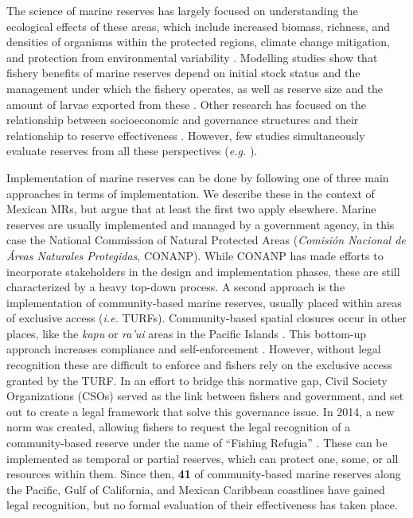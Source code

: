 \documentclass{frontiersSCNS}
\begin{document}
The science of marine reserves has largely focused on understanding the
ecological effects of these areas, which include increased biomass,
richness, and densities of organisms within the protected regions,
climate change mitigation, and protection from environmental variability
\citep{lester_2009-Ks,giakoumi_2017-V2,sala_2017-69,roberts_2017-J9,micheli_2012-EU}.
Modelling studies show that fishery benefits of marine reserves depend
on initial stock status and the management under which the fishery
operates, as well as reserve size and the amount of larvae exported from
these \citep{hilborn_2006,krueck_2017-J1}. Other research has focused on
the relationship between socioeconomic and governance structures and
their relationship to reserve effectiveness
\citep{halpern_2013,lpezangarita_2014,mascia_2017-m_}. However, few
studies simultaneously evaluate reserves from all these perspectives
(\emph{e.g.} \citet{lpezangarita_2014}).

Implementation of marine reserves can be done by following one of three
main approaches in terms of implementation. We describe these in the
context of Mexican MRs, but argue that at least the first two apply
elsewhere. Marine reserves are usually implemented and managed by a
government agency, in this case the National Commission of Natural
Protected Areas (\emph{Comisión Nacional de Áreas Naturales Protegidas},
CONANP). While CONANP has made efforts to incorporate stakeholders in
the design and implementation phases, these are still characterized by a
heavy top-down process. A second approach is the implementation of
community-based marine reserves, usually placed within areas of
exclusive access (\emph{i.e.} TURFs). Community-based spatial closures
occur in other places, like the \emph{kapu} or \emph{ra'ui} areas in the
Pacific Islands \citep{bohnsack_2004,johannes_2002}. This bottom-up
approach increases compliance and self-enforcement
\citep{gelcich_2015-Gw,espinosaromero_2014-PY,beger_2004-Y8}. However,
without legal recognition these are difficult to enforce and fishers
rely on the exclusive access granted by the TURF. In an effort to bridge
this normative gap, Civil Society Organizations (CSOs) served as the
link between fishers and government, and set out to create a legal
framework that solve this governance issue. In 2014, a new norm was
created, allowing fishers to request the legal recognition of a
community-based reserve under the name of ``Fishing Refugia''
\citep{nom}. These can be implemented as temporal or partial reserves,
which can protect one, some, or all resources within them. Since then,
\textbf{41} of community-based marine reserves along the Pacific, Gulf
of California, and Mexican Caribbean coastlines have gained legal
recognition, but no formal evaluation of their effectiveness has taken
place.
\end{document}
